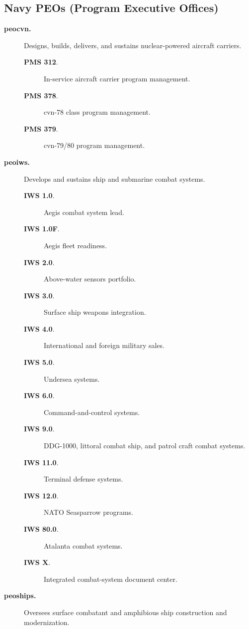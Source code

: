 \documentclass[../main.tex]{subfiles}
\begin{document}
\begin{refsegment}
\section{Navy PEOs (Program Executive Offices)}
\minibib
\begin{description}
	\item[\textbf{\ac{peocvn}.}] Designs, builds, delivers, and sustains nuclear-powered aircraft carriers.
      \begin{description}
        \item[\textbf{PMS 312}.] In-service aircraft carrier program management.
        \item[\textbf{PMS 378}.] \ac{cvn}-78 class program management.
        \item[\textbf{PMS 379}.] \ac{cvn}-79/80 program management.
      \end{description}
	\item[\textbf{\ac{peoiws}.}] Develops and sustains ship and submarine combat systems.
      \begin{description}
        \item[\textbf{IWS 1.0}.] Aegis combat system lead.
        \item[\textbf{IWS 1.0F}.] Aegis fleet readiness.
        \item[\textbf{IWS 2.0}.] Above-water sensors portfolio.
        \item[\textbf{IWS 3.0}.] Surface ship weapons integration.
        \item[\textbf{IWS 4.0}.] International and foreign military sales.
        \item[\textbf{IWS 5.0}.] Undersea systems.
        \item[\textbf{IWS 6.0}.] Command-and-control systems.
        \item[\textbf{IWS 9.0}.] DDG-1000, littoral combat ship, and patrol craft combat systems.
        \item[\textbf{IWS 11.0}.] Terminal defense systems.
        \item[\textbf{IWS 12.0}.] NATO Seasparrow programs.
        \item[\textbf{IWS 80.0}.] Atalanta combat systems.
        \item[\textbf{IWS X}.] Integrated combat-system document center.
      \end{description}
	\item[\textbf{\ac{peoships}.}] Oversees surface combatant and amphibious ship construction and modernization.

\end{description}
\end{refsegment}
\end{document}
